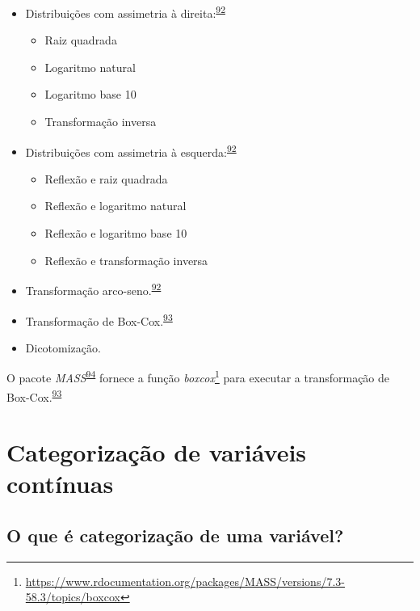\documentclass[
  a4paper,
]{book}
\renewcommand{\href}[2]{#2\footnote{\url{#1}}}
\newenvironment{infobox}[1]
  {
  \begin{itemize}
  \renewcommand{\labelitemi}{
    \raisebox{-.7\height}[0pt][0pt]{
      {\setkeys{Gin}{width=3em,keepaspectratio}
        \texttt{[image: \#1]}}
    }
  }
  \setlength{\fboxsep}{1em}
  \begin{blackbox}
  \item
  }
  {
  \end{blackbox}
  \end{itemize}
  }
\begin{document}
\begin{itemize}
\item
  Distribuições com assimetria à direita:\textsuperscript{\protect\hyperlink{ref-osborne2010}{92}}

  \begin{itemize}
  \item
    Raiz quadrada
  \item
    Logaritmo natural
  \item
    Logaritmo base 10
  \item
    Transformação inversa
  \end{itemize}
\item
  Distribuições com assimetria à esquerda:\textsuperscript{\protect\hyperlink{ref-osborne2010}{92}}

  \begin{itemize}
  \item
    Reflexão e raiz quadrada
  \item
    Reflexão e logaritmo natural
  \item
    Reflexão e logaritmo base 10
  \item
    Reflexão e transformação inversa
  \end{itemize}
\item
  Transformação arco-seno.\textsuperscript{\protect\hyperlink{ref-osborne2010}{92}}
\item
  Transformação de Box-Cox.\textsuperscript{\protect\hyperlink{ref-box1964}{93}}
\item
  Dicotomização.
\end{itemize}

\begin{infobox}{images/Rlogo}
O pacote \emph{MASS}\textsuperscript{\protect\hyperlink{ref-MASS}{94}} fornece a função \href{https://www.rdocumentation.org/packages/MASS/versions/7.3-58.3/topics/boxcox}{\emph{boxcox}} para executar a transformação de Box-Cox.\textsuperscript{\protect\hyperlink{ref-box1964}{93}}

\end{infobox}

\hypertarget{categorizacao}{%
\section{Categorização de variáveis contínuas}\label{categorizacao}}

\hypertarget{o-que-uxe9-categorizauxe7uxe3o-de-uma-variuxe1vel}{%
\subsection{O que é categorização de uma variável?}\label{o-que-uxe9-categorizauxe7uxe3o-de-uma-variuxe1vel}}
\end{document}
